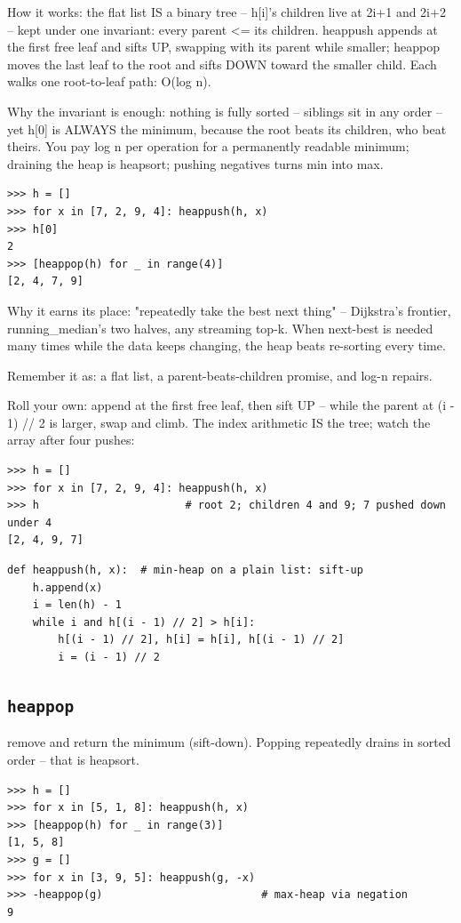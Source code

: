 \documentclass[10pt,letterpaper]{book}
\begin{document}
How it works: the flat list IS a binary tree -- h[i]'s children live at 2i+1 and 2i+2 -- kept under one invariant: every parent <= its children. heappush appends at the first free leaf and sifts UP, swapping with its parent while smaller; heappop moves the last leaf to the root and sifts DOWN toward the smaller child. Each walks one root-to-leaf path: O(log n).


Why the invariant is enough: nothing is fully sorted -- siblings sit in any order -- yet h[0] is ALWAYS the minimum, because the root beats its children, who beat theirs. You pay log n per operation for a permanently readable minimum; draining the heap is heapsort; pushing negatives turns min into max.

\begin{lstlisting}[style=ex]
>>> h = []
>>> for x in [7, 2, 9, 4]: heappush(h, x)
>>> h[0]
2
>>> [heappop(h) for _ in range(4)]
[2, 4, 7, 9]
\end{lstlisting}

Why it earns its place: "repeatedly take the best next thing" -- Dijkstra's frontier, running\_median's two halves, any streaming top-k. When next-best is needed many times while the data keeps changing, the heap beats re-sorting every time.


Remember it as: a flat list, a parent-beats-children promise, and log-n repairs.


Roll your own: append at the first free leaf, then sift UP -- while the parent at (i - 1) // 2 is larger, swap and climb. The index arithmetic IS the tree; watch the array after four pushes:

\begin{lstlisting}[style=ex]
>>> h = []
>>> for x in [7, 2, 9, 4]: heappush(h, x)
>>> h                       # root 2; children 4 and 9; 7 pushed down under 4
[2, 4, 9, 7]
\end{lstlisting}
\begin{lstlisting}[style=ex]
def heappush(h, x):  # min-heap on a plain list: sift-up
    h.append(x)
    i = len(h) - 1
    while i and h[(i - 1) // 2] > h[i]:
        h[(i - 1) // 2], h[i] = h[i], h[(i - 1) // 2]
        i = (i - 1) // 2
\end{lstlisting}

\subsection{\texttt{heappop}}\label{def:heappop}
remove and return the minimum (sift-down). Popping repeatedly drains in sorted order -- that is heapsort.
\begin{lstlisting}[style=ex]
>>> h = []
>>> for x in [5, 1, 8]: heappush(h, x)
>>> [heappop(h) for _ in range(3)]
[1, 5, 8]
>>> g = []
>>> for x in [3, 9, 5]: heappush(g, -x)
>>> -heappop(g)                         # max-heap via negation
9
\end{lstlisting}
\end{document}
